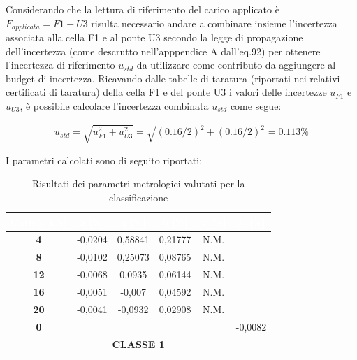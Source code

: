 \documentclass[a4paper, twoside]{article}
\begin{document}
Considerando che la lettura di riferimento del carico applicato è $F_{applicata}=F1-U3$ risulta necessario andare a combinare insieme l'incertezza associata alla cella F1 e al ponte U3 secondo la legge di propagazione dell'incertezza (come descrutto nell'apppendice A dall'eq.92) per ottenere l'incertezza di riferimento $u_{std}$ da utilizzare come contributo da aggiungere al budget di incertezza. Ricavando dalle tabelle di taratura (riportati nei relativi certificati di taratura) della cella F1 e del ponte U3 i valori delle incertezze $u_{F1}$ e $u_{U3}$, è possibile calcolare l'incertezza combinata $u_{std}$ come segue:

\begin{equation}
    u_{std} = \sqrt{u_{F1}^2 + u_{U3}^2} = \sqrt{(0.16/2)^2 + (0.16/2)^2} = 0.113 \%
\end{equation}

I parametri calcolati sono di seguito riportati:

\begin{table}[H]
    \centering
    \renewcommand{\arraystretch}{1.3}
    \begin{tabular}{|c|c|c|c|c|c|}
        \hline
        \rowcolor{headerblue}
        \textcolor{white}{\textbf{Carico [kN]}} & \textcolor{white}{\textbf{a [\%]}} & \textcolor{white}{\textbf{q [\%]}} & \textcolor{white}{\textbf{b [\%]}} & \textcolor{white}{\textbf{v [\%]}} & \textcolor{white}{\textbf{$f_0$ [\%]}} \\
        \hline
        \rowcolor{rowlight}
        \textbf{4} & -0,0204 & 0,58841 & 0,21777 & N.M. & \\
        \hline
        \textbf{8} & -0,0102 & 0,25073 & 0,08765 & N.M. & \\
        \hline
        \rowcolor{rowlight}
        \textbf{12} & -0,0068 & 0,0935 & 0,06144 & N.M. & \\
        \hline
        \textbf{16} & -0,0051 & -0,007 & 0,04592 & N.M. & \\
        \hline
        \rowcolor{rowlight}
        \textbf{20} & -0,0041 & -0,0932 & 0,02908 & N.M. & \\
        \hline
        \textbf{0} & & & & & -0,0082 \\
        \hline
        \multicolumn{6}{|c|}{\textbf{CLASSE 1}} \\
        \hline
    \end{tabular}
    \caption{Risultati dei parametri metrologici valutati per la classificazione}
    \label{tab:risultati_parametri_provino}
\end{table}
\end{document}
